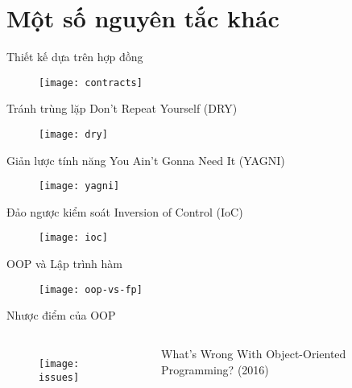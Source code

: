 \documentclass{beamer}
\begin{document}
\section{Một số nguyên tắc khác}

\begin{frame}{Thiết kế dựa trên hợp đồng}
    \begin{figure}
        \centering
        \texttt{[image: contracts]}
    \end{figure}
\end{frame}

\begin{frame}{Tránh trùng lặp}
    \Large Don't Repeat Yourself (DRY)
    \begin{figure}
        \centering
        \texttt{[image: dry]}
    \end{figure}
\end{frame}

\begin{frame}{Giản lược tính năng}
    \Large You Ain't Gonna Need It (YAGNI)
    \begin{figure}
        \centering
        \texttt{[image: yagni]}
    \end{figure}
\end{frame}

\begin{frame}{Đảo ngược kiểm soát}
    \Large Inversion of Control (IoC)
    \begin{figure}
        \centering
        \texttt{[image: ioc]}
    \end{figure}
\end{frame}

\begin{frame}{OOP và Lập trình hàm}
    \begin{figure}
        \centering
        \texttt{[image: oop-vs-fp]}
    \end{figure}
\end{frame}

\begin{frame}{Nhược điểm của OOP}
    \begin{columns}
        \begin{figure}
            \centering
            \texttt{[image: issues]}
        \end{figure}
        \Large What's Wrong With Object-Oriented Programming? (2016)
    \end{columns}
\end{frame}
\end{document}
